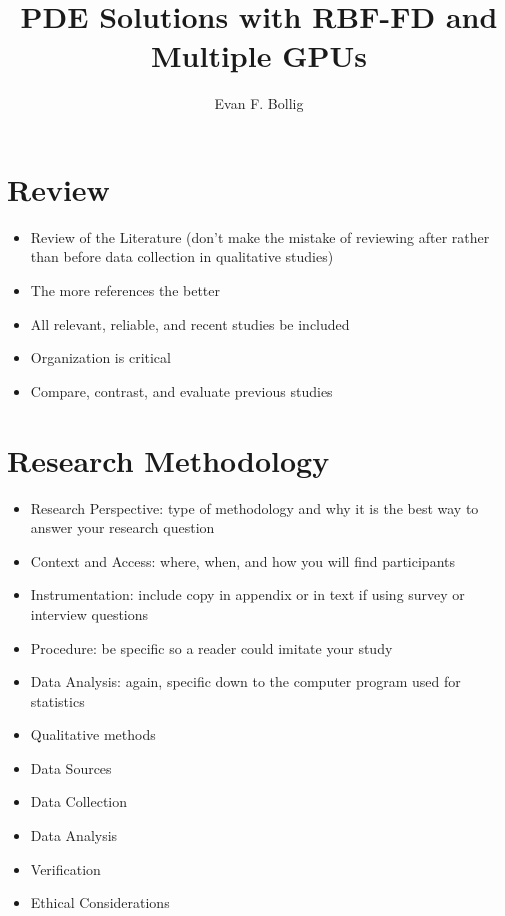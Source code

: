 \documentclass[11pt]{fsuthesis}
\title{PDE Solutions with RBF-FD and Multiple GPUs}
\author{Evan F. Bollig}
\begin{document}
%
%
%
%
%
%
%
%
%

\mainmatter



\chapter{Review}
\begin{itemize} 
	\item Review of the Literature (don’t make the mistake of reviewing after rather than before data collection in qualitative studies)
	\item The more references the better
	\item All relevant, reliable, and recent studies be included
	\item Organization is critical 
	\item Compare, contrast, and evaluate previous studies
\end{itemize}

\chapter{Research Methodology}
\begin{itemize} 
	\item Research Perspective: type of methodology and why it is the best way to answer your research question
	\item Context and Access: where, when, and how you will ﬁnd participants 
 	\item Instrumentation: include copy in appendix or in text if using survey or interview questions
 	\item Procedure: be specific so a reader could imitate your study 
 	\item Data Analysis: again, specific down to the computer program used for statistics
 	\item Qualitative methods
 	\item Data Sources
 	\item Data Collection
 	\item Data Analysis
 	\item Verification
 	\item Ethical Considerations
\end{itemize} 
\end{document}
